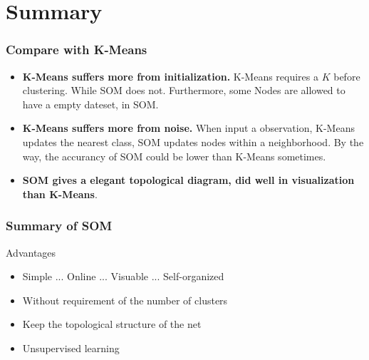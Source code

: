 \section{Summary}
\begin{frame}
\sectionpage
\end{frame}

\begin{frame}
    \frametitle{Compare with K-Means}
    \begin{itemize}
        \item \textbf{K-Means suffers more from initialization.} K-Means requires a $K$ before clustering. While SOM does not. Furthermore, some Nodes are allowed to have a empty dateset, in SOM.
        \item \textbf{K-Means suffers more from noise.} When input a observation, K-Means updates the nearest class, SOM updates nodes within a neighborhood. By the way, the accurancy of SOM could be lower than K-Means sometimes.
        \item \textbf{SOM gives a elegant topological diagram, did well in visualization than K-Means}.
    \end{itemize}

\end{frame}

\begin{frame}
    \frametitle{Summary of SOM}
    \begin{block}{Advantages}
        \begin{itemize}
        \item Simple ... Online ... Visuable ... Self-organized
        \item Without requirement of the number of clusters
        \item Keep the topological structure of the net
        \item Unsupervised learning
        \end{itemize}
    \end{block}
\end{frame}

